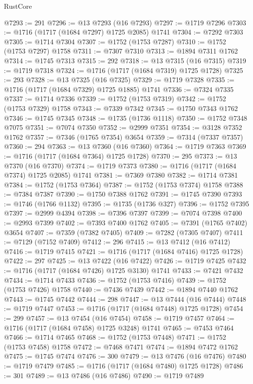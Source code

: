 \begin{lexlean}{RustCore}
\begin{coremodule}
@7293 := 291
@7296 := @13 @7293 (@16 @7293)
@7297 := @1719 @7296
@7303 := @1716 (@1717 (@1684 @7297) @1725 @2085) @1741
@7304 := @7292 @7303
@7305 := @1714 @7304
@7307 := @1752 (@1753 @7287)
@7310 := @1752 (@1753 @7297) @1758
@7311 := @7307 @7310
@7313 := @1894 @7311 @1762
@7314 := @1745 @7313
@7315 := 292
@7318 := @13 @7315 (@16 @7315)
@7319 := @1719 @7318
@7324 := @1716 (@1717 (@1684 @7319) @1725 @1728)
@7325 := 293
@7328 := @13 @7325 (@16 @7325)
@7329 := @1719 @7328
@7335 := @1716 (@1717 (@1684 @7329) @1725 @1885) @1741
@7336 := @7324 @7335
@7337 := @1714 @7336
@7339 := @1752 (@1753 @7319)
@7342 := @1752 (@1753 @7329) @1758
@7343 := @7339 @7342
@7345 := @1750 @7343 @1762
@7346 := @1745 @7345
@7348 := @1735 (@1736 @1118)
@7350 := @1752 @7348 @7075
@7351 := @7074 @7350
@7352 := @2999 @7351
@7354 := @3128 @7352 @1762
@7357 := @7346 (@1765 @7354) @3654
@7359 := @7314 (@7337 @7357)
@7360 := 294
@7363 := @13 @7360 (@16 @7360)
@7364 := @1719 @7363
@7369 := @1716 (@1717 (@1684 @7364) @1725 @1728)
@7370 := 295
@7373 := @13 @7370 (@16 @7370)
@7374 := @1719 @7373
@7380 := @1716 (@1717 (@1684 @7374) @1725 @2085) @1741
@7381 := @7369 @7380
@7382 := @1714 @7381
@7384 := @1752 (@1753 @7364)
@7387 := @1752 (@1753 @7374) @1758
@7388 := @7384 @7387
@7390 := @1750 @7388 @1762
@7391 := @1745 @7390
@7393 := @1746 (@1766 @1132)
@7395 := @1735 (@1736 @327)
@7396 := @1752 @7395
@7397 := @2999 @4394
@7398 := @7396 @7397
@7399 := @7074 @7398
@7400 := @2993 @7399
@7402 := @7393 @7400 @1762
@7405 := @7391 (@1765 @7402) @3654
@7407 := @7359 (@7382 @7405)
@7409 := @7282 (@7305 @7407)
@7411 := @7129 (@7152 @7409)
@7412 := 296
@7415 := @13 @7412 (@16 @7412)
@7416 := @1719 @7415
@7421 := @1716 (@1717 (@1684 @7416) @1725 @1728)
@7422 := 297
@7425 := @13 @7422 (@16 @7422)
@7426 := @1719 @7425
@7432 := @1716 (@1717 (@1684 @7426) @1725 @3130) @1741
@7433 := @7421 @7432
@7434 := @1714 @7433
@7436 := @1752 (@1753 @7416)
@7439 := @1752 (@1753 @7426) @1758
@7440 := @7436 @7439
@7442 := @1894 @7440 @1762
@7443 := @1745 @7442
@7444 := 298
@7447 := @13 @7444 (@16 @7444)
@7448 := @1719 @7447
@7453 := @1716 (@1717 (@1684 @7448) @1725 @1728)
@7454 := 299
@7457 := @13 @7454 (@16 @7454)
@7458 := @1719 @7457
@7464 := @1716 (@1717 (@1684 @7458) @1725 @3248) @1741
@7465 := @7453 @7464
@7466 := @1714 @7465
@7468 := @1752 (@1753 @7448)
@7471 := @1752 (@1753 @7458) @1758
@7472 := @7468 @7471
@7474 := @1894 @7472 @1762
@7475 := @1745 @7474
@7476 := 300
@7479 := @13 @7476 (@16 @7476)
@7480 := @1719 @7479
@7485 := @1716 (@1717 (@1684 @7480) @1725 @1728)
@7486 := 301
@7489 := @13 @7486 (@16 @7486)
@7490 := @1719 @7489

\end{coremodule}
\end{lexlean}
